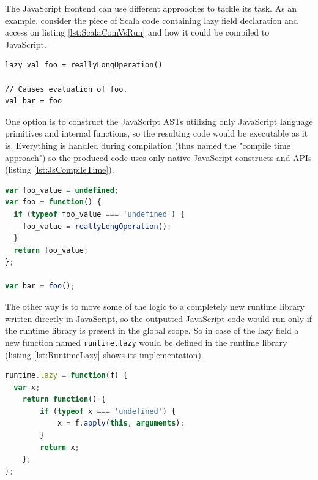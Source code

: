 \documentclass[12pt,a4paper]{report}
\begin{document}
The JavaScript frontend can use different approaches to tackle its task. As an example, consider the piece of Scala code containing lazy field declaration and access on listing \ref{lst:ScalaComVsRun} and how it could be compiled to JavaScript.

\begin{minipage}{\linewidth}
\begin{lstlisting}[caption={Lazy field declaration and access.},label={lst:ScalaComVsRun}]
lazy val foo = reallyLongOperation()

// Causes evaluation of foo.
val bar = foo 
\end{lstlisting}
\end{minipage}

One option is to construct the JavaScript ASTs utilizing only JavaScript language primitives and internal functions, so the resulting code would be executable as it is. Everything is handled during compilation (thus named the "compile time approach") so the produced code uses only native JavaScript constructs and APIs (listing \ref{lst:JsCompileTime}).

\begin{minipage}{\linewidth}
\begin{lstlisting}[language=JavaScript,caption={Compile time option outcome.},label={lst:JsCompileTime}]
var foo_value = undefined;
var foo = function() {
  if (typeof foo_value === 'undefined') {
    foo_value = reallyLongOperation();
  }
  return foo_value;
};

var bar = foo();
\end{lstlisting} 
\end{minipage}

The other way is to move some of the logic to a completely new runtime library written directly in JavaScript, so the outputted JavaScript code would run only if the runtime library is present in the global scope. So in case of the lazy field a new function named \texttt{runtime.lazy} would be defined in the runtime library (listing \ref{lst:RuntimeLazy} shows its implementation).

\begin{minipage}{\linewidth}
\begin{lstlisting}[language=JavaScript,caption={Runtime function that lazifies evaluation.},label={lst:RuntimeLazy}]
runtime.lazy = function(f) {
  var x;
	return function() {
		if (typeof x === 'undefined') {
			x = f.apply(this, arguments);
		}
		return x;
	};
};
\end{lstlisting}
\end{minipage}
\end{document}
